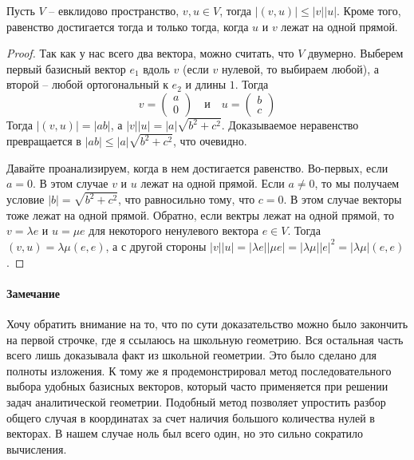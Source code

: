 \begin{claim}
Пусть $V$ -- евклидово пространство, $v,u\in V$, тогда $|(v,u)|\leqslant |v| |u|$.
Кроме того, равенство достигается тогда и только тогда, когда $u$ и $v$ лежат на одной прямой.
\end{claim}
\begin{proof}
Так как у нас всего два вектора, можно считать, что $V$ двумерно.
Выберем первый базисный вектор $e_1$ вдоль $v$ (если $v$ нулевой, то выбираем любой), а второй -- любой ортогональный к $e_2$ и длины $1$.
Тогда
\[
v = 
\begin{pmatrix}
{a}\\{0}
\end{pmatrix}
\quad\text{и}\quad
u = 
\begin{pmatrix}
{b}\\{c}
\end{pmatrix}
\]
Тогда $|(v, u)| = |ab|$, а $|v||u| = |a|\sqrt{b^2 + c^2}$.
Доказываемое неравенство превращается в $|ab|\leqslant |a|\sqrt{b^2 + c^2}$, что очевидно.

Давайте проанализируем, когда в нем достигается равенство.
Во-первых, если $a = 0$.
В этом случае $v$ и $u$ лежат на одной прямой.
Если $a \neq 0$, то мы получаем условие $|b| = \sqrt{b^2 + c^2}$, что равносильно тому, что $c = 0$.
В этом случае векторы тоже лежат на одной прямой.
Обратно, если вектры лежат на одной прямой, то $v = \lambda e$ и $u = \mu e$ для некоторого ненулевого вектора $e\in V$.
Тогда $(v,u) = \lambda\mu (e,e)$, а с другой стороны $|v||u| = |\lambda e||\mu e| = |\lambda \mu| |e|^2 = |\lambda \mu|(e,e)$.
\end{proof}

\paragraph{Замечание} 

Хочу обратить внимание на то, что по сути доказательство можно было закончить на первой строчке, где я ссылаюсь  на школьную геометрию.
Вся остальная часть всего лишь доказывала факт из школьной геометрии.
Это было сделано для полноты изложения.
К тому же я продемонстрировал метод последовательного выбора удобных базисных векторов, который часто применяется при решении задач аналитической геометрии.
Подобный метод позволяет упростить разбор общего случая в координатах за счет наличия большого количества нулей в векторах.
В нашем случае ноль был всего один, но это сильно сократило вычисления.

